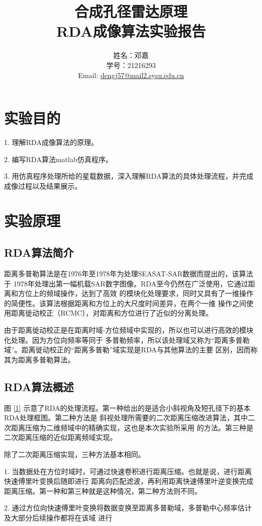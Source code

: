 \documentclass{article}
\title{合成孔径雷达原理 \\ RDA成像算法实验报告}
\author{姓名：邓嘉 \\ 学号：21216293 \\ Email: \href{mailto:dengj57@mail2.sysu.edu.cn}{dengj57@mail2.sysu.edu.cn}}
\date{}
\begin{document}
\maketitle


\section{实验目的}

1. 理解RDA成像算法的原理。

2. 编写RDA算法matlab仿真程序。

3. 用仿真程序处理所给的星载数据，深入理解RDA算法的具体处理流程，并完成成像过程以及结果展示。

\section{实验原理}
\subsection{RDA算法简介}

距离多普勒算法是在1976年至1978年为处理SEASAT-SAR数据而提出的，该算法于
1978年处理出第一幅机载SAR数字图像。RDA至今仍然在广泛使用，它通过距离和方位上的频域操作，达到了高效
的模块化处理要求，同时又具有了一维操作的简便性。该算法根据距离和方位上的大尺度时间差异，在两个一维
操作之间使用距离徙动校正（RCMC），对距离和方位进行了近似的分离处理。

由于距离徙动校正是在距离时域-方位频域中实现的，所以也可以进行高效的模块化处理。因为方位向频率等同于
多普勒频率，所以该处理域又称为“距离多普勒域”。距离徙动校正的“距离多普勒”域实现是RDA与其他算法的主要
区别，因而称其为距离多普勒算法。


\subsection{RDA算法概述}
图 \ref{1} 示意了RDA的处理流程。第一种给出的是适合小斜视角及短孔径下的基本RDA处理框图。第二种方法是
斜视处理所需要的二次距离压缩改进算法，其中二次距离压缩为二维频域中的精确实现，这也是本次实验所采用
的方法。第三种是二次距离压缩的近似距离频域实现。

除了二次距离压缩实现，三种方法基本相同。

1. 当数据处在方位时域时，可通过快速卷积进行距离压缩。也就是说，进行距离快速傅里叶变换后随即进行
距离向匹配滤波，再利用距离快速傅里叶逆变换完成距离压缩。第一种和第三种就是这种情况，第二种方法则不同。

2. 通过方位向快速傅里叶变换将数据变换至距离多普勒域，多普勒中心频率估计及大部分后续操作都将在该域
进行
\end{document}
